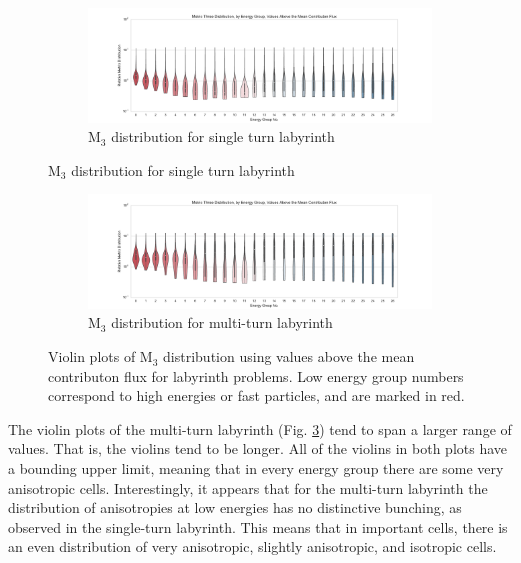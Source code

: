 \begin{figure}[htb!]
  \centering
  \begin{subfigure}[t]{\textwidth}
    \includegraphics[width=\linewidth]{./chapters/characterization_probs/figures/char/maze2/metric_three_violin_mean.pdf}
    \caption{M$_{3}$ distribution for single turn labyrinth}
    \label{fig:maze2M3violins}
  \end{subfigure}
\end{figure}
\begin{figure}[htb!]\ContinuedFloat
  \centering
  \begin{subfigure}[t]{\textwidth}
    \includegraphics[width=\linewidth]{./chapters/characterization_probs/figures/char/maze1/metric_three_violin_mean.pdf}
    \caption{M$_3$ distribution for multi-turn labyrinth}
    \label{fig:maze1M3violins}
  \end{subfigure}
  \caption[Violin plots of M$_{3}$ distribution using values above the mean
  contributon flux for labyrinth problems.]
  {Violin plots of M$_{3}$ distribution using values above the mean
  contributon flux for labyrinth problems. Low energy group numbers correspond
  to high energies or fast particles, and are marked in red.}
  \label{fig:labyrinthviolins}
\end{figure}

The violin plots of the multi-turn labyrinth (Fig. \ref{fig:maze1M3violins})
tend to span a larger range of values. That is, the violins tend to be longer.
All of the violins in both plots have a bounding upper limit, meaning that in
every energy group there are some very anisotropic cells. Interestingly, it
appears that for the multi-turn labyrinth the distribution of anisotropies at
low energies has no distinctive bunching, as observed in the single-turn
labyrinth. This means that in important cells, there is an even distribution of
very anisotropic, slightly anisotropic, and isotropic cells.

